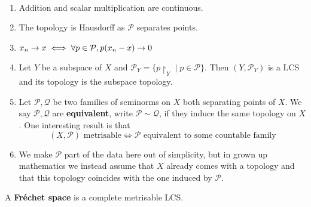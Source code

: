 \documentclass{article}
\begin{document}
\begin{rmks}~

  \begin{enumerate}
    \item Addition and scalar multiplication are continuous.
    \item The topology is Hausdorff as $\mathcal P$ separates points.
    \item $x_n \rightarrow x \iff \forall p \in \mathcal P, p(x_n - x) \rightarrow 0$
    \item Let $Y$ be a subspace of $X$ and $\mathcal P_Y = \{p\restriction_Y \mid p \in \mathcal P\}$. Then $(Y, \mathcal P_Y)$ is a LCS and its topology is the subspace topology.
    \item Let $\mathcal P, \mathcal Q$ be two families of seminorms on $X$ both separating points of $X$. We say $\mathcal P, \mathcal Q$ are {\bf equivalent}, write $\mathcal P \sim \mathcal Q$, if they induce the same topology on $X$. One interesting result is that
    $$ (X, \mathcal P) \text{ metrisable} \iff \mathcal P \text{ equivalent to some countable family}$$
    \item We make $\mathcal P$ part of the data here out of simplicity, but in grown up mathematics we instead assume that $X$ already comes with a topology and that this topology coincides with the one induced by $\mathcal P$.
  \end{enumerate}
\end{rmks}

\begin{defi}
  A {\bf Fréchet space} is a complete metrisable LCS.
\end{defi}
\end{document}
